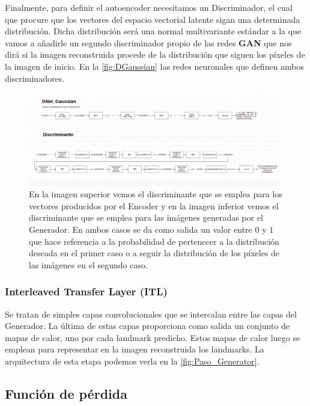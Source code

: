             \noindent Finalmente, para definir el autoencoder necesitamos un Discriminador, el cual que procure que los vectores del espacio vectorial latente sigan una determinada distribución. Dicha distribución será una normal multivariante estándar a la que vamos a añadirle un segundo discriminador propio de las redes \textbf{GAN} que nos dirá si la imagen reconstruida procede de la distribución que siguen los píxeles de la imagen de inicio. En la \autoref{fig:DGaussian} las redes neuronales que definen ambos discriminadores.

            \begin{figure}[!h]
                \centering
                \includegraphics[width=0.99\textwidth]{img/DGaussian.png}
                \caption{En la imagen superior vemos el discriminante que se emplea para los vectores producidos por el Encoder y en la imagen inferior vemos el discriminante que se emplea para las imágenes generadas por el Generador. En ambos casos se da como salida un valor entre $0$ y $1$ que hace referencia a la probabilidad de pertenecer a la distribución deseada en el primer caso o a seguir la distribución de los píxeles de las imágenes en el segundo caso.}
                \label{fig:DGaussian}
            \end{figure}

        \subsubsection{Interleaved Transfer Layer (ITL)}
            
            \noindent Se tratan de simples capas convolucionales que se intercalan entre las capas del Generador. La última de estas capas proporciona como salida un conjunto de mapas de calor, uno por cada landmark predicho. Estos mapas de calor luego se emplean para representar en la imagen reconstruida los landmarks. La arquitectura de esta etapa podemos verla en la \autoref{fig:Paso_Generator}.
        
    \subsection{Función de pérdida}

